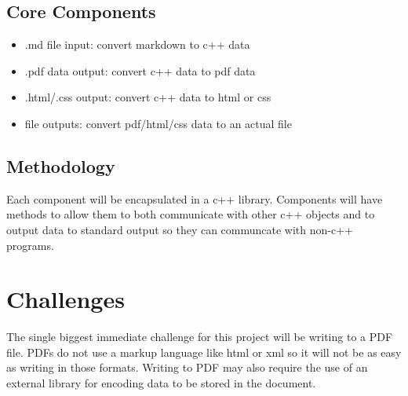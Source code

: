 \documentclass[12pt]{article}
\begin{document}
	\subsection{Core Components}
		\begin{itemize}
			\item .md file input: convert markdown to c++ data
			\item .pdf data output: convert c++ data to pdf data
			\item .html/.css output: convert c++ data to html or css
			\item file outputs: convert pdf/html/css data to an actual file
		\end{itemize}
	\subsection{Methodology}
		Each component will be encapsulated in a c++ library. Components will have methods to allow them to both communicate with other c++ objects and to output data to standard output so they can communcate with non-c++ programs.
\section{Challenges}
The single biggest immediate challenge for this project will be writing to a PDF file. PDFs do not use a markup language like html or xml so it will not be as easy as writing in those formats. Writing to PDF may also require the use of an external library for encoding data to be stored in the document.
\end{document}
